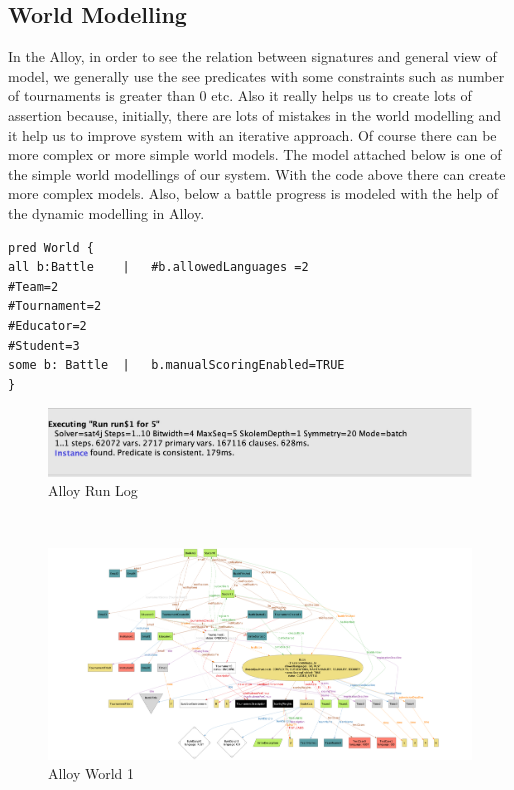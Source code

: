    \subsection{World Modelling}
   In the Alloy, in order to see the relation between signatures and general view of model, we generally use the see predicates with some constraints such as number of tournaments is greater than 0 etc. Also it really helps us to create lots of assertion because, initially, there are lots of mistakes in the world modelling and it help us to improve system with an iterative approach. Of course there can be more complex or more simple world models. The model attached below is one of the simple world modellings of our system. With the code above there can create more complex models. Also, below a battle progress is modeled with the help of the dynamic modelling in Alloy.
    \\

   \begin{lstlisting}
pred World {
all b:Battle	|	#b.allowedLanguages =2
#Team=2
#Tournament=2
#Educator=2
#Student=3
some b: Battle	|	b.manualScoringEnabled=TRUE
}
   \end{lstlisting}

\begin{figure}[H]
    \centering
    \includegraphics[scale=0.3]{Images/Alloy/alloyRun.jpeg}
    \caption{Alloy Run Log}
\end{figure}

   \\

   \begin{figure}[H]
    \centering
    \includegraphics[scale=0.8]{Images/Alloy/World1_Alloy.png}
    \caption{Alloy World 1}
\end{figure}


